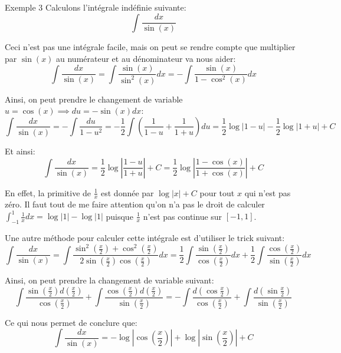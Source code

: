 \documentclass[a4paper]{article}
\begin{document}
\begin{parag}{Exemple 3}
    Calculons l'intégrale indéfinie suivante:
    \[\int \frac{dx}{\sin\left(x\right)}\]

    Ceci n'est pas une intégrale facile, mais on peut se rendre compte que multiplier par $\sin\left(x\right)$ au numérateur et au dénominateur va nous aider:
    \[\int \frac{dx}{\sin\left(x\right)} = \int \frac{\sin\left(x\right)}{\sin^2\left(x\right)} dx = -\int \frac{\sin\left(x\right)}{1 - \cos^2\left(x\right)}dx\]

    Ainsi, on peut prendre le changement de variable $u = \cos\left(x\right) \implies du = -\sin\left(x\right)dx$:
    \[\int \frac{dx}{\sin\left(x\right)} = -\int \frac{du}{1 - u^2} = - \frac{1}{2} \int\left(\frac{1}{1 - u} + \frac{1}{1 + u}\right)du = \frac{1}{2} \log\left|1 - u\right| - \frac{1}{2}\log\left|1 + u\right| + C\]

    Et ainsi: 
    \[\int \frac{dx}{\sin\left(x\right)} = \frac{1}{2} \log\left|\frac{1-u}{1+u}\right| + C = \frac{1}{2}\log\left|\frac{1 - \cos\left(x\right)}{1 + \cos\left(x\right)}\right| + C\]
    

    En effet, la primitive de $\frac{1}{x}$ est donnée par $\log\left|x\right| + C$ pour tout $x$ qui n'est pas zéro. Il faut tout de me faire attention qu'on n'a pas le droit de calculer $\int_{-1}^{1} \frac{1}{x}dx = \log\left|1\right| - \log\left|1\right|$ puisque $\frac{1}{x}$ n'est pas continue sur $\left[-1, 1\right]$.

    \vspace{1em}

    Une autre méthode pour calculer cette intégrale est d'utiliser le trick suivant:
    \[\int \frac{dx}{\sin\left(x\right)} = \int \frac{\sin^2\left(\frac{x}{2}\right) + \cos^2\left(\frac{x}{2}\right)}{2\sin\left(\frac{x}{2}\right)\cos\left(\frac{x}{2}\right)} dx = \frac{1}{2} \int \frac{\sin\left(\frac{x}{2}\right)}{\cos\left(\frac{x}{2}\right)}dx + \frac{1}{2} \int \frac{\cos\left(\frac{x}{2}\right)}{\sin\left(\frac{x}{2}\right)}dx\]

    Ainsi, on peut prendre la changement de variable suivant:
    \[\int \frac{\sin\left(\frac{x}{2}\right) d\left(\frac{x}{2}\right)}{\cos\left(\frac{x}{2}\right)} + \int \frac{\cos\left(\frac{x}{2}\right)d\left(\frac{x}{2}\right)}{\sin\left(\frac{x}{2}\right)} = -\int \frac{d\left(\cos \frac{x}{2}\right)}{\cos \left(\frac{x}{2}\right)} + \int \frac{d\left(\sin \frac{x}{2}\right)}{\sin \left(\frac{x}{2}\right)}\]

    Ce qui nous permet de conclure que: 
    \[\int \frac{dx}{\sin\left(x\right)} = -\log\left|\cos \left(\frac{x}{2}\right)\right| + \log\left|\sin \left(\frac{x}{2}\right)\right| + C\]


\end{parag}
\end{document}

